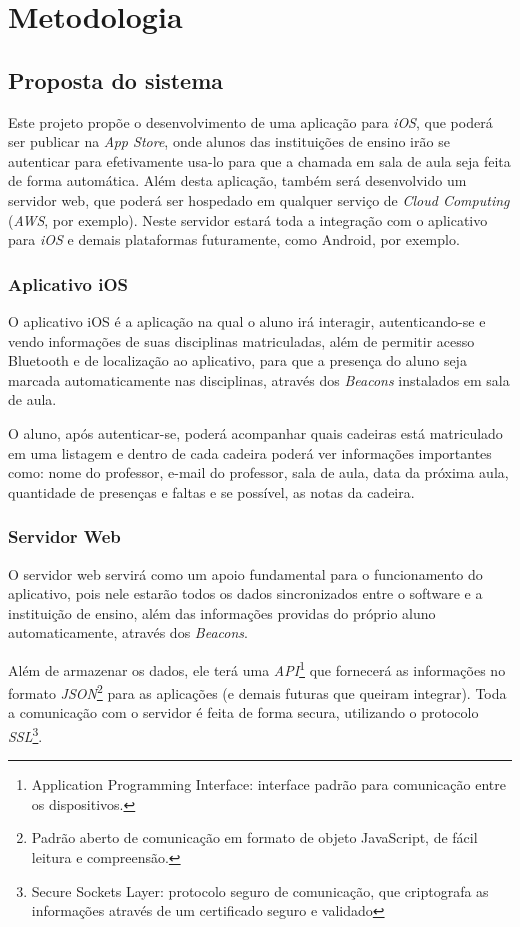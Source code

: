 \documentclass[
	12pt,
	oneside,
	a4paper,
	english,
	brazil,
]{abntex2}
\begin{document}
\chapter{Metodologia}
\section{Proposta do sistema}

Este projeto propõe o desenvolvimento de uma aplicação para \emph{iOS}, que poderá ser publicar na \emph{App Store}, onde alunos das instituições de ensino irão se autenticar para efetivamente usa-lo para que a chamada em sala de aula seja feita de forma automática. Além desta aplicação, também será desenvolvido um servidor web, que poderá ser hospedado em qualquer serviço de \emph{Cloud Computing} (\emph{AWS}, por exemplo). Neste servidor estará toda a integração com o aplicativo para \emph{iOS} e demais plataformas futuramente, como Android, por exemplo.

\subsection{Aplicativo iOS}

O aplicativo iOS é a aplicação na qual o aluno irá interagir, autenticando-se e vendo informações de suas disciplinas matriculadas, além de permitir acesso Bluetooth e de localização ao aplicativo, para que a presença do aluno seja marcada automaticamente nas disciplinas, através dos \emph{Beacons} instalados em sala de aula.

O aluno, após autenticar-se, poderá acompanhar quais cadeiras está matriculado em uma listagem e dentro de cada cadeira poderá ver informações importantes como: nome do professor, e-mail do professor, sala de aula, data da próxima aula, quantidade de presenças e faltas e se possível, as notas da cadeira.

\subsection{Servidor Web}

O servidor web servirá como um apoio fundamental para o funcionamento do aplicativo, pois nele estarão todos os dados sincronizados entre o software e a instituição de ensino, além das informações providas do próprio aluno automaticamente, através dos \emph{Beacons}.

Além de armazenar os dados, ele terá uma \emph{API}\footnote{Application Programming Interface: interface padrão para comunicação entre os dispositivos.} que fornecerá as informações no formato \emph{JSON}\footnote{Padrão aberto de comunicação em formato de objeto JavaScript, de fácil leitura e compreensão.} para as aplicações (e demais futuras que queiram integrar). Toda a comunicação com o servidor é feita de forma secura, utilizando o protocolo \emph{SSL}\footnote{Secure Sockets Layer: protocolo seguro de comunicação, que criptografa as informações através de um certificado seguro e validado}. 
\end{document}
